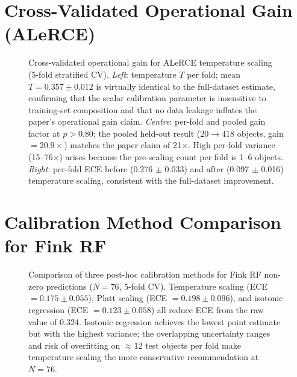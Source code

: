 \documentclass[twocolumn]{aastex631}
\begin{document}





\appendix

\section{Cross-Validated Operational Gain (ALeRCE)} \label{app:cv}

\begin{figure}
\caption{Cross-validated operational gain for ALeRCE temperature scaling (5-fold stratified CV). \emph{Left}: temperature $T$ per fold; mean $T = 0.357 \pm 0.012$ is virtually identical to the full-dataset estimate, confirming that the scalar calibration parameter is insensitive to training-set composition and that no data leakage inflates the paper's operational gain claim. \emph{Centre}: per-fold and pooled gain factor at $p > 0.80$; the pooled held-out result ($20 \to 418$ objects, gain $= 20.9\times$) matches the paper claim of 21$\times$. High per-fold variance (15--76$\times$) arises because the pre-scaling count per fold is 1--6 objects. \emph{Right}: per-fold ECE before (0.276 $\pm$ 0.033) and after (0.097 $\pm$ 0.016) temperature scaling, consistent with the full-dataset improvement. \label{fig:alerce_cv}}
\end{figure}


\section{Calibration Method Comparison for Fink RF} \label{app:methods}

\begin{figure}
\caption{Comparison of three post-hoc calibration methods for Fink RF non-zero predictions ($N = 76$, 5-fold CV). Temperature scaling (ECE $= 0.175 \pm 0.055$), Platt scaling (ECE $= 0.198 \pm 0.096$), and isotonic regression (ECE $= 0.123 \pm 0.058$) all reduce ECE from the raw value of 0.324. Isotonic regression achieves the lowest point estimate but with the highest variance; the overlapping uncertainty ranges and risk of overfitting on $\approx$12 test objects per fold make temperature scaling the more conservative recommendation at $N = 76$. \label{fig:fink_methods}}
\end{figure}
\end{document}
